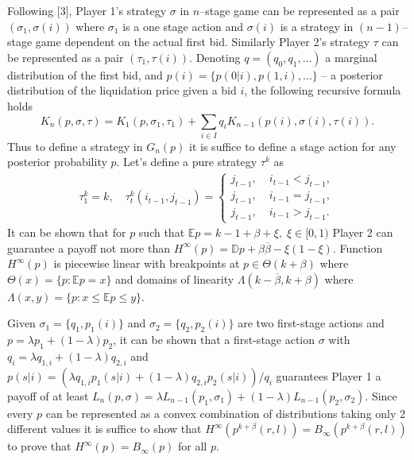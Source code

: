 Following [3], Player 1's strategy $\sigma$ in $n$--stage game can be
represented as a pair $(\sigma_1, \sigma(i))$ where $\sigma_1$ is a one stage
action and $\sigma(i)$ is a strategy in $(n-1)$--stage game dependent on the
actual first bid. Similarly Player 2's strategy $\tau$ can be represented as a
pair $(\tau_1, \tau(i))$. Denoting $q = (q_0, q_1, \ldots)$ a marginal
distribution of the first bid, and $p(i) = \{p(0 | i), p(1, i), \ldots\}$ -- a
posterior distribution of the liquidation price given a bid $i$, the following
recursive formula holds
\begin{equation*}
  K_n(p, \sigma, \tau) = K_1(p, \sigma_1, \tau_1) +
  \sum_{i \in I} q_i K_{n-1}(p(i), \sigma(i), \tau(i)).
\end{equation*}
Thus to define a strategy in $G_n(p)$ it is suffice to define a stage action for
any posterior probability $p$. Let's define a pure strategy $\tau^k$ as
\begin{gather*}
  \tau_1^k = k, \quad
  \tau_t^k(i_{t-1}, j_{t-1}) =
  \begin{cases}
    j_{t-1}, &\; i_{t-1} < j_{t-1},\\
    j_{t-1}, &\; i_{t-1} = j_{t-1},\\
    j_{t-1}, &\; i_{t-1} > j_{t-1}.
  \end{cases}
\end{gather*}
It can be shown that for $p$ such that $\mathbb{E} p = k - 1 + \beta + \xi, \;
\xi \in [0, 1)$ Player 2 can guarantee a payoff not more than $H^\infty(p) =
\mathbb{D} p + \beta\overline{\beta} -\xi(1-\xi)$. Function $H^\infty(p)$ is
piecewise linear with breakpoints at $p \in \Theta(k + \beta)$ where $\Theta(x)
= \{p: \mathbb{E} p = x\}$ and domains of linearity $\Lambda(k -
\overline{\beta}, k + \beta)$ where $\Lambda(x, y) = \{p: x \leq \mathbb{E}p
\leq y \}$.

Given $\sigma_1 = \{q_1, p_1(i)\}$ and $\sigma_2 = \{q_2, p_2(i)\}$ are two
first-stage actions and $p = \lambda p_1 + (1-\lambda)p_2$, it can be shown that
a first-stage action $\sigma$ with $q_i = \lambda q_{1,i} + (1-\lambda) q_{2,i}$
and $p(s|i) = (\lambda q_{1,i} p_1(s|i) + (1-\lambda) q_{2,i} p_2(s|i))/q_i$
guarantees Player 1 a payoff of at least $L_n(p, \sigma) = \lambda L_{n-1}(p_1,
\sigma_1) + (1-\lambda) L_{n-1}(p_2, \sigma_2)$. Since every $p$ can be
represented as a convex combination of distributions taking only 2 different
values it is suffice to show that $H^\infty(p^{k+\beta}(r, l)) =
B_\infty(p^{k+\beta}(r, l))$ to prove that $H^\infty(p) = B_\infty(p)$ for all
$p$.

